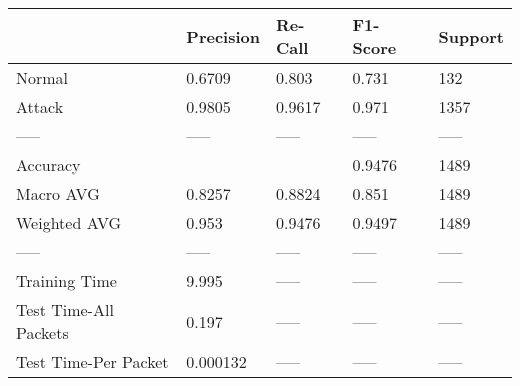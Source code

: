 \begin{tabular}{lllll}
\toprule
{} & Precision & Re-Call & F1-Score & Support \\
\midrule
Normal                &    0.6709 &   0.803 &    0.731 &     132 \\
Attack                &    0.9805 &  0.9617 &    0.971 &    1357 \\
-----                 &     ----- &   ----- &    ----- &   ----- \\
Accuracy              &           &         &   0.9476 &    1489 \\
Macro AVG             &    0.8257 &  0.8824 &    0.851 &    1489 \\
Weighted AVG          &     0.953 &  0.9476 &   0.9497 &    1489 \\
-----                 &     ----- &   ----- &    ----- &   ----- \\
Training Time         &     9.995 &   ----- &    ----- &   ----- \\
Test Time-All Packets &     0.197 &   ----- &    ----- &   ----- \\
Test Time-Per Packet  &  0.000132 &   ----- &    ----- &   ----- \\
\bottomrule
\end{tabular}
